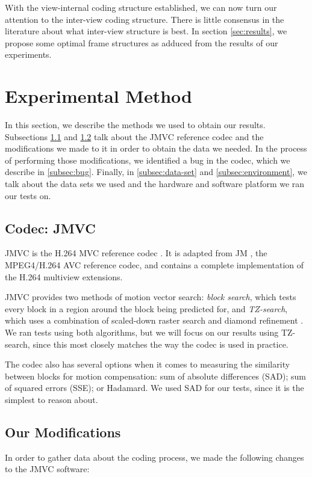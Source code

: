 \documentclass{sig-alternate-05-2015}
\begin{document}
With the view-internal coding structure established, we can now turn our
attention to the inter-view coding structure. There is little consensus in
the literature about what inter-view structure is best. In section
\ref{sec:results}, we propose some optimal frame structures as adduced from the
results of our experiments.

\section{Experimental Method} %
\label{sec:method} %
In this section, we describe the methods we used to obtain our results.
Subsections \ref{subsec:jmvc} and \ref{subsec:modifications} talk about the JMVC
reference codec and the modifications we made to it in order to obtain the data
we needed. In the process of performing those modifications, we identified a bug
in the codec, which we describe in \ref{subsec:bug}. Finally, in
\ref{subsec:data-set} and \ref{subsec:environment}, we talk about the data sets
we used and the hardware and software platform we ran our tests on.

\subsection{Codec: JMVC}
\label{subsec:jmvc}
JMVC is the H.264 MVC reference codec \cite{schwarz:jmvc}. It is adapted from
JM \cite{suehring:jm}, the MPEG4/H.264 AVC reference codec, and contains a
complete implementation of the H.264 multiview extensions.

JMVC provides two methods of motion vector search: {\it block search}, which
tests every block in a region around the block being predicted for, and {\it
TZ-search}, which uses a combination of scaled-down raster search and diamond
refinement \cite{purnachand:improvements}. We ran tests using both algorithms,
but we will focus on our results using TZ-search, since this most closely
matches the way the codec is used in practice.

The codec also has several options when it comes to measuring the similarity
between blocks for motion compensation: sum of absolute differences (SAD); sum
of squared errors (SSE); or Hadamard. We used SAD for our tests, since it is
the simplest to reason about.

\subsection{Our Modifications}
\label{subsec:modifications}
In order to gather data about the coding process, we made the following changes
to the JMVC software:
\end{document}
